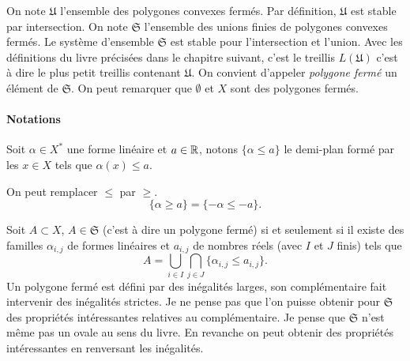 On  note $\mathfrak U$ l'ensemble des polygones convexes fermés. Par définition, $\mathfrak{U}$ est stable par intersection. On note $\mathfrak{S}$ l'ensemble des unions finies de polygones convexes fermés. Le système d'ensemble $\mathfrak{S}$ est stable pour l'intersection et l'union. Avec les définitions du livre précisées dans le chapitre suivant, c'est le treillis $L(\mathfrak U)$ c'est à dire le plus petit treillis contenant $\mathfrak{U}$.\newline
On convient d'appeler \emph{polygone fermé} un élément de $\mathfrak{S}$. On peut remarquer que $\emptyset$ et $X$ sont des polygones fermés.

\paragraph{Notations}
\label{sec:notpolygones}
Soit $\alpha \in X^*$ une forme linéaire et $a\in \mathbb{R}$, notons $\{ \alpha \leq a\}$ le demi-plan formé par les $x \in X$ tels que $\alpha(x) \leq a$.


\begin{rem} On peut remplacer $\leq$ par $\geq$.
 \begin{displaymath}
   \{ \alpha \geq a \} = \{ -\alpha \leq -a \}.
 \end{displaymath}
\end{rem}

Soit $A\subset X$, $A \in \mathfrak{S}$ (c'est à dire un polygone fermé) si et seulement si il existe des familles $\alpha_{i,j}$ de formes linéaires et $a_{i,j}$ de nombres réels (avec $I$ et $J$ finis) tels que
\begin{displaymath}
 A = \bigcup_{i \in I} \bigcap_{j \in J}\{ \alpha_{i,j} \leq a_{i,j}\}.
\end{displaymath}
Un polygone fermé est défini par des inégalités larges, son complémentaire fait intervenir des inégalités strictes. Je ne pense pas que l'on puisse obtenir pour $\mathfrak{S}$ des propriétés intéressantes relatives au complémentaire. Je pense que $\mathfrak{S}$ n'est même pas un ovale au sens du livre.\newline
En revanche on peut obtenir des propriétés intéressantes en renversant les inégalités.

